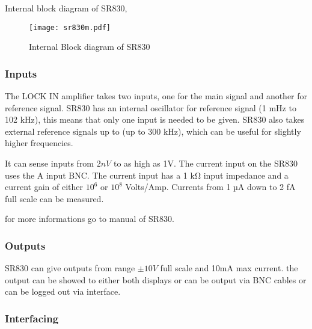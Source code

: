 Internal block diagram of SR830,

\begin{figure*}[hbt!]
  \centering\texttt{[image: sr830m.pdf]}
  \caption{Internal Block diagram of SR830}
\end{figure*}

\subsubsection{Inputs}
The LOCK IN amplifier takes two inputs, one for the main signal and another for reference signal. SR830 has an internal oscillator for reference signal (1 mHz to 102 kHz), this means that only one input is needed to be given. SR830 also takes external reference signals up to (up to 300 kHz), which can be useful for slightly higher frequencies. 

It can sense inputs from $2 nV$ to as high as 1V. The current input on the SR830 uses the A input BNC. The current input has a 1 kΩ input impedance and a current gain of either $10^6$ or $10^8$ Volts/Amp. Currents from 1 µA down to 2 fA full scale can be measured.

for more informations go to manual of SR830.\cite{srssr830m}

\subsubsection{Outputs}

SR830 can give outputs from range $\pm 10 V$ full scale and 10mA max current. the output can be showed to either both displays or can be output via BNC cables or can be logged out via interface.


\subsubsection{Interfacing}

